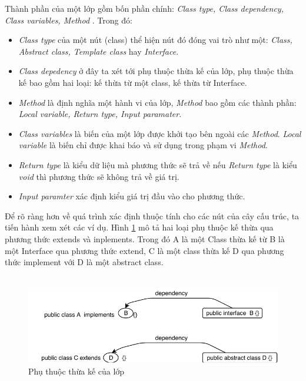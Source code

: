 \documentclass[12pt]{report}
\begin{document}
\noindent Thành phần của một lớp gồm bốn phần chính: \textit{Class type, Class dependency, Class variables, Method }. Trong đó:
\vspace{-0.1cm}
\begin{itemize}
	\item \textit{Class type} của một nút (class) thể hiện nút đó đóng vai trò như một:\textit{ Class, Abstract class, Template class} hay \textit{Interface}.
	\item \textit{Class depedency} ở đây  ta xét tới phụ thuộc thừa kế của lớp, phụ thuộc thừa kế bao gồm hai loại: kế thừa từ một class, kế thừa từ Interface.
	\item \textit{Method} là định nghĩa một hành vi của lớp, \textit{Method} bao gồm các thành phần: \textit{Local variable, Return type, Input paramater}.
	\item  \textit{Class variables} là biến của một lớp được khởi tạo bên ngoài các \textit{Method}. \textit{Local variable} là biến chỉ được khai báo và sử dụng trong phạm vi \textit{Method}.  
	\item \textit{Return type} là kiểu dữ liệu mà phương thức sẽ trả về nếu \textit{Return type} là kiểu \textit{void} thì phương thức sẽ không trả về giá trị.
	\item \textit{Input paramter} xác định kiểu giá trị đầu vào cho phương thức.
\end{itemize}
Để rõ ràng hơn về quá trình xác định thuộc tính cho các nút của cây cấu trúc, ta tiến hành xem xét các ví dụ.
Hình \ref{fig:dependecy_extend} mô tả hai loại phụ thuộc kế thừa qua phương thức extends và inplements. Trong đó A là một Class thừa kế từ B là một Interface qua phương thức extend, C là một class thừa kế D qua phương thức implement với D là một abstract class.\\\\
\begin{figure}[!htbp]
	\centering
	\vspace{-1cm}
	\includegraphics[scale=0.45]{images/class_dependency}
	\caption{Phụ thuộc thừa kế của lớp}
	\label{fig:dependecy_extend}
\end{figure}
\end{document}
